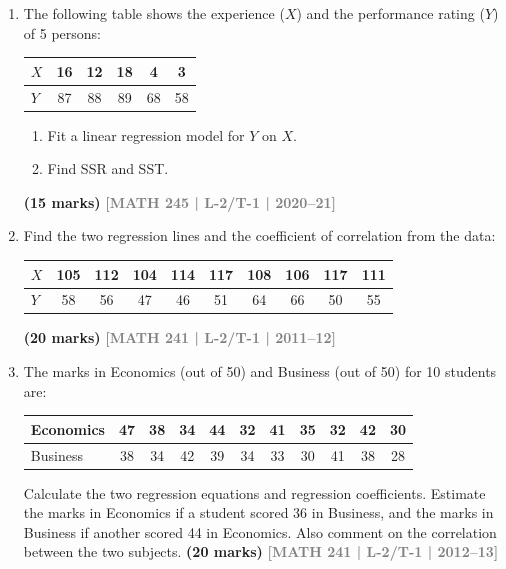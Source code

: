 \documentclass[12pt,a4paper]{article}
\newcommand{\yr}[1]{\hfill\textcolor{gray}{\small\textbf{[#1]}}}
\newcommand{\mk}[1]{\textcolor{orange!70!black}{\small\textbf{(#1 marks)}}}
\begin{document}
\begin{enumerate}

\item The following table shows the experience ($X$) and the performance rating ($Y$) of 5 persons:
\begin{center}
\begin{tabular}{lccccc}
\toprule
$X$ & 16 & 12 & 18 & 4 & 3 \\
\midrule
$Y$ & 87 & 88 & 89 & 68 & 58 \\
\bottomrule
\end{tabular}
\end{center}
\begin{enumerate}
  \item Fit a linear regression model for $Y$ on $X$.
  \item Find SSR and SST.
\end{enumerate}
\mk{15} \yr{MATH 245 | L-2/T-1 | 2020--21}

\item Find the two regression lines and the coefficient of correlation from the data:
\begin{center}
\begin{tabular}{lccccccccc}
\toprule
$X$ & 105 & 112 & 104 & 114 & 117 & 108 & 106 & 117 & 111 \\
\midrule
$Y$ & 58  & 56  & 47  & 46  & 51  & 64  & 66  & 50  & 55  \\
\bottomrule
\end{tabular}
\end{center}
\mk{20} \yr{MATH 241 | L-2/T-1 | 2011--12}

\item The marks in Economics (out of 50) and Business (out of 50) for 10 students are:
\begin{center}
\begin{tabular}{lcccccccccc}
\toprule
Economics & 47 & 38 & 34 & 44 & 32 & 41 & 35 & 32 & 42 & 30 \\
\midrule
Business  & 38 & 34 & 42 & 39 & 34 & 33 & 30 & 41 & 38 & 28 \\
\bottomrule
\end{tabular}
\end{center}
Calculate the two regression equations and regression coefficients. Estimate the marks in Economics if a student scored 36 in Business, and the marks in Business if another scored 44 in Economics. Also comment on the correlation between the two subjects.
\mk{20} \yr{MATH 241 | L-2/T-1 | 2012--13}


\end{enumerate}
\end{document}
